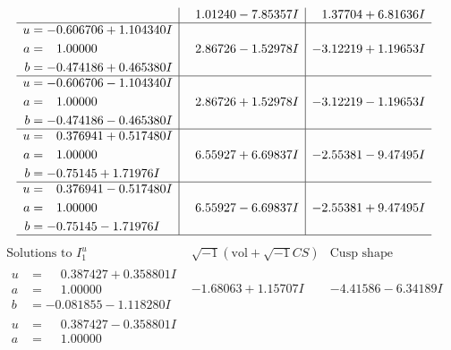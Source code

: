 \documentclass[1p]{elsarticle_modified}
\theoremstyle{definition}
\newcommand{\I}{\sqrt{-1}}
\begin{document}
$$\begin{array}{c|c|c}
 & \phantom{-}1.01240 - 7.85357 I & \phantom{-}1.37704 + 6.81636 I \\ \hline\begin{aligned}
u &= -0.606706 + 1.104340 I \\
a &= \phantom{-}1.00000\phantom{ +0.000000I} \\
b &= -0.474186 + 0.465380 I\end{aligned}
 & \phantom{-}2.86726 - 1.52978 I & -3.12219 + 1.19653 I \\ \hline\begin{aligned}
u &= -0.606706 - 1.104340 I \\
a &= \phantom{-}1.00000\phantom{ +0.000000I} \\
b &= -0.474186 - 0.465380 I\end{aligned}
 & \phantom{-}2.86726 + 1.52978 I & -3.12219 - 1.19653 I \\ \hline\begin{aligned}
u &= \phantom{-}0.376941 + 0.517480 I \\
a &= \phantom{-}1.00000\phantom{ +0.000000I} \\
b &= -0.75145 + 1.71976 I\end{aligned}
 & \phantom{-}6.55927 + 6.69837 I & -2.55381 - 9.47495 I \\ \hline\begin{aligned}
u &= \phantom{-}0.376941 - 0.517480 I \\
a &= \phantom{-}1.00000\phantom{ +0.000000I} \\
b &= -0.75145 - 1.71976 I\end{aligned}
 & \phantom{-}6.55927 - 6.69837 I & -2.55381 + 9.47495 I\\
 \hline 
 \end{array}$$\newpage$$\begin{array}{c|c|c}  
\text{Solutions to }I^u_{1}& \I (\text{vol} + \sqrt{-1}CS) & \text{Cusp shape}\\
 \hline 
\begin{aligned}
u &= \phantom{-}0.387427 + 0.358801 I \\
a &= \phantom{-}1.00000\phantom{ +0.000000I} \\
b &= -0.081855 - 1.118280 I\end{aligned}
 & -1.68063 + 1.15707 I & -4.41586 - 6.34189 I \\ \hline\begin{aligned}
u &= \phantom{-}0.387427 - 0.358801 I \\
a &= \phantom{-}1.00000\phantom{ +0.000000I} \\

\end{aligned}
\end{array}$$
\end{document}
